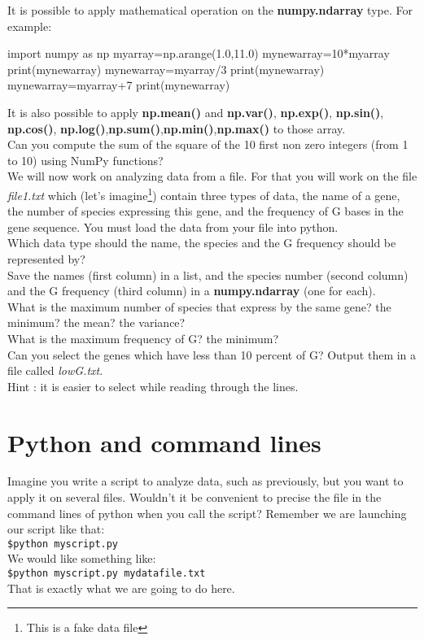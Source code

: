 \documentclass[article,10pt]{scrartcl}
\begin{document}
It is possible to apply mathematical operation on the \textbf{numpy.ndarray} type. For example:
\begin{python}
import numpy as np
myarray=np.arange(1.0,11.0)
mynewarray=10*myarray
print(mynewarray) 
mynewarray=myarray/3
print(mynewarray) 
mynewarray=myarray+7
print(mynewarray) 
\end{python}
It is also possible to apply \textbf{np.mean()} and \textbf{np.var()}, \textbf{np.exp()}, \textbf{np.sin()}, \textbf{np.cos()}, \textbf{np.log()},\textbf{np.sum()},\textbf{np.min()},\textbf{np.max()} to those array. \\
Can you compute the sum of the square of the 10 first non zero integers (from 1 to 10) using NumPy functions?
\\

We will now work on analyzing data from a file. For that you will work on the file \textit{file1.txt} which (let's imagine\footnote{This is a fake data file}) contain three types of data, the name of a gene, the number of species expressing this gene, and the frequency of G bases in the gene sequence. You must load the data from your file into python.\\
 Which data type should the name, the species and the G frequency should be represented by?\\


 Save the names (first column) in a list, and the species number (second column) and the G frequency (third column) in a \textbf{numpy.ndarray} (one for each). 
\\

What is the maximum number of species that express by the same gene? the minimum? the mean? the variance?\\
What is the maximum frequency of G? the minimum?\\

Can you select the genes which have less than 10 percent of G? Output them in a file called \textit{lowG.txt}.\\
 Hint : it is easier to select while reading through the lines.\\

\section*{Python and command lines}
Imagine you write a script to analyze data, such as previously, but you want to apply it on several files. Wouldn't it be convenient to precise the file in the command lines of python when you call the script? Remember we are launching our script like that:\\
\texttt{\$python myscript.py}\\
We would like something like:\\
\texttt{\$python myscript.py mydatafile.txt}\\
That is exactly what we are going to do here.\\
\end{document}
